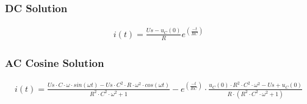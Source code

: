 \documentclass{article}
\begin{document}
\subsubsection{DC Solution}
\begin{align*}
   i(t) = \frac{Us-u_C(0)}{R} e^(\frac{-t}{RC})
\end{align*}
\subsubsection{AC Cosine Solution}
\begin{align*}
   i(t) = \frac{Us\cdot C\cdot \omega \cdot sin(\omega t)-Us\cdot C^2\cdot R \cdot \omega^2 \cdot cos(\omega t)}{R^2\cdot C^2 \cdot \omega ^2 +1}-e^(\frac{-t}{RC})\cdot\frac{u_C(0)\cdot R^2\cdot C^2 \cdot \omega ^2-Us+u_C(0)}{R\cdot (R^2\cdot C^2 \cdot \omega ^2 +1)}
\end{align*}
\end{document}
